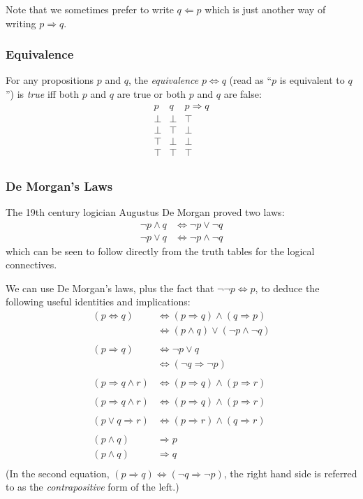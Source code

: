 \documentclass[a4paper,11pt,notitlepage,onecolumn]{article}
\newcommand{\True}%
{\top}
\newcommand{\False}%
{\perp}
\newcommand{\Not}[1]%
{\neg{}#1}
\newcommand{\Conj}%
{\wedge}
\newcommand{\Disj}%
{\vee}
\newcommand{\Imp}%
{\Rightarrow}
\newcommand{\Bimp}%
{\Leftarrow}
\newcommand{\Eqv}%
{\Leftrightarrow}
\begin{document}
Note that we sometimes prefer to write $q \Bimp p$ which is just another
way of writing $p \Imp q$.

\subsubsection{Equivalence}

For any propositions $p$ and $q$, the \emph{equivalence} $p \Eqv q$
(read as ``$p$ is equivalent to $q$'') is \emph{true} iff 
both $p$ and $q$ are true or both $p$ and $q$ are false:
\[
\begin{array}{cc|c}
p       & q       & p \Imp q \\
\hline
\False  & \False  & \True \\
\False  & \True   & \False \\
\True   & \False  & \False \\
\True   & \True   & \True \\
\end{array}
\]

\subsubsection{De Morgan's Laws}

The 19th century logician Augustus De Morgan proved two laws:
\begin{align*}
\Not{p \Conj q}
& \Eqv \Not{p} \Disj \Not{q} \\
\Not{p \Disj q}
& \Eqv \Not{p} \Conj \Not{q}
\end{align*}
which can be seen to follow directly from the truth tables for the
logical connectives.

We can use De Morgan's laws, plus the fact that $\Not{\Not{p}} \Eqv p$,
to deduce the following useful identities and implications:
\begin{align*}
(p \Eqv q)
& \Eqv (p \Imp q) \Conj (q \Imp p) \\
& \Eqv (p \Conj q) \Disj (\Not{p} \Conj \Not{q}) \\
\\
(p \Imp q)
& \Eqv \Not{p} \Disj q \\
& \Eqv (\Not{q} \Imp \Not{p}) \\
\\
(p \Imp q \Conj r)
& \Eqv (p \Imp q) \Conj (p \Imp r) \\
\\
(p \Imp q \Conj r)
& \Eqv (p \Imp q) \Conj (p \Imp r) \\
\\
(p \Disj q \Imp r)
& \Eqv (p \Imp r) \Conj (q \Imp r) \\
\\
(p \Conj q)
& \Imp p \\
(p \Conj q)
& \Imp q \\
\end{align*}
(In the second equation, $(p \Imp q) \Eqv (\Not{q} \Imp \Not{p})$, the
right hand side is referred to as the \emph{contrapositive} form of the
left.)
\end{document}
